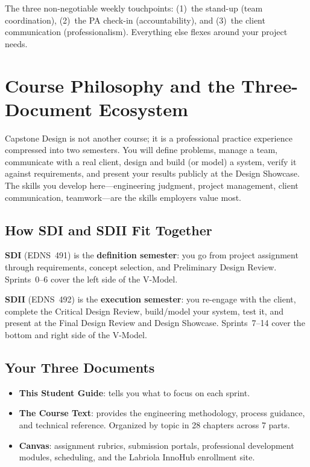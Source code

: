 \documentclass[11pt,letterpaper]{article}
\begin{document}
\begin{protip}
The three non-negotiable weekly touchpoints: (1)~the stand-up (team coordination), (2)~the PA check-in (accountability), and (3)~the client communication (professionalism). Everything else flexes around your project needs.
\end{protip}


\section{Course Philosophy and the Three-Document Ecosystem}

Capstone Design is not another course; it is a professional practice experience compressed into two semesters. You will define problems, manage a team, communicate with a real client, design and build (or model) a system, verify it against requirements, and present your results publicly at the Design Showcase. The skills you develop here---engineering judgment, project management, client communication, teamwork---are the skills employers value most.

\subsection{How SDI and SDII Fit Together}
\textbf{SDI} (EDNS~491) is the \textbf{definition semester}: you go from project assignment through requirements, concept selection, and Preliminary Design Review. Sprints~0--6 cover the left side of the V-Model.

\textbf{SDII} (EDNS~492) is the \textbf{execution semester}: you re-engage with the client, complete the Critical Design Review, build/model your system, test it, and present at the Final Design Review and Design Showcase. Sprints~7--14 cover the bottom and right side of the V-Model.

\subsection{Your Three Documents}
\begin{itemize}[nosep,leftmargin=1.5em]
\item \textbf{This Student Guide}: tells you what to focus on each sprint.
\item \textbf{The Course Text}: provides the engineering methodology, process guidance, and technical reference. Organized by topic in 28 chapters across 7 parts.
\item \textbf{Canvas}: assignment rubrics, submission portals, professional development modules, scheduling, and the Labriola InnoHub enrollment site.
\end{itemize}
\end{document}
